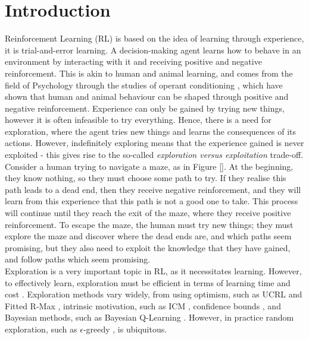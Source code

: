 
\chapter{Introduction}

\label{chapter1}

Reinforcement Learning (RL) \cite{Sutton1998} is based on the idea of learning through experience, it is trial-and-error learning. A decision-making agent learns how to behave in an environment by interacting with it and receiving positive and negative reinforcement. This is akin to human and animal learning, and comes from the field of Psychology through the studies of operant conditioning \cite{nla.cat-vn2770732}, which have shown that human and animal behaviour can be shaped through positive and negative reinforcement. Experience can only be gained by trying new things, however it is often infeasible to try everything. Hence, there is a need for exploration, where the agent tries new things and learns the consequences of its actions. However, indefinitely exploring means that the experience gained is never exploited - this gives rise to the so-called \textit{exploration versus exploitation} trade-off.
\\Consider a human trying to navigate a maze, as in Figure []. At the beginning, they know nothing, so they must choose some path to try. If they realise this path leads to a dead end, then they receive negative reinforcement, and they will learn from this experience that this path is not a good one to take. This process will continue until they reach the exit of the maze, where they receive positive reinforcement. To escape the maze, the human must try new things; they must explore the maze and discover where the dead ends are, and which paths seem promising, but they also need to exploit the knowledge that they have gained, and follow paths which seem promising.
\\Exploration is a very important topic in RL, as it necessitates learning. However, to effectively learn, exploration must be efficient in terms of learning time and cost \cite{Thrun-1992-15850}.
Exploration methods vary widely, from using optimism, such as UCRL \cite{NIPS2006_c1b70d96} and Fitted R-Max \cite{SARA07-jong}, intrinsic motivation, such as ICM \cite{DBLP:journals/corr/PathakAED17}, confidence bounds \cite{10.5555/911176}, and Bayesian methods, such as Bayesian Q-Learning \cite{10.5555/944919.944941}. However, in practice random exploration, such as $\epsilon$-greedy \cite{Watkins:1989, conf/nips/Sutton95}, is ubiquitous.
